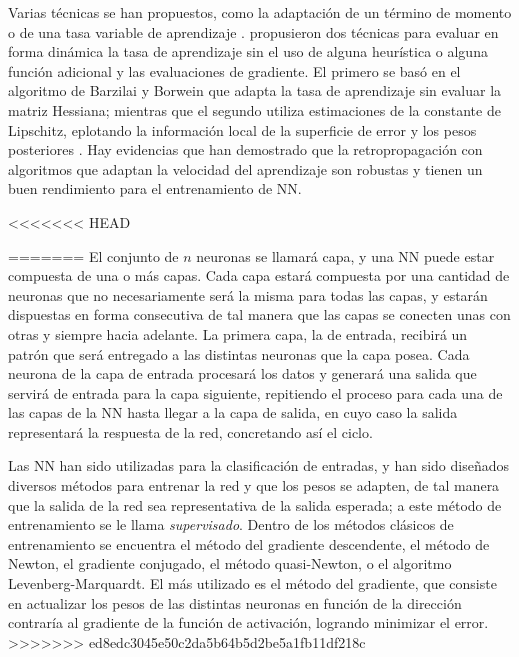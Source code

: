 Varias técnicas se han propuestos, como la adaptación de un término de momento \cite{Jacobs1988, Rumelhart1986b} o de una tasa variable de aprendizaje \cite{Jacobs1988,Vogl1988}.  propusieron dos técnicas para evaluar en forma dinámica la tasa de aprendizaje sin el uso de alguna heurística o alguna función adicional y las evaluaciones de gradiente. El primero se basó en el algoritmo de Barzilai y Borwein \cite{Barzilai1988} que adapta la tasa de aprendizaje sin evaluar la matriz Hessiana; mientras que el segundo utiliza estimaciones de la constante de Lipschitz, eplotando la información local de la superficie de error y los pesos posteriores \cite{Magoulas1997}. Hay evidencias \cite{Magoulas1997, Plagianakos2002, Plagianakos1998} que han demostrado que la retropropagación con algoritmos que adaptan la velocidad del aprendizaje son robustas y tienen un buen rendimiento para el entrenamiento de NN.

<<<<<<< HEAD

=======
El conjunto de $n$ neuronas se llamará capa, y una NN puede estar compuesta de una o más capas. Cada capa estará compuesta por una cantidad de neuronas que no necesariamente será la misma para todas las capas, y estarán dispuestas en forma consecutiva de tal manera que las capas se conecten unas con otras y siempre hacia adelante. La primera capa, la de entrada, recibirá un patrón que será entregado a las distintas neuronas que la capa posea. Cada neurona de la capa de entrada procesará los datos y generará una salida que servirá de entrada para la capa siguiente, repitiendo el proceso para cada una de las capas de la NN hasta llegar a la capa de salida, en cuyo caso la salida representará la respuesta de la red, concretando así el ciclo.

Las NN han sido utilizadas para la clasificación de entradas, y han sido diseñados diversos métodos para entrenar la red y que los pesos se adapten, de tal manera que la salida de la red sea representativa de la salida esperada; a este método de entrenamiento se le llama {\em supervisado}. Dentro de los métodos clásicos de entrenamiento se encuentra el método del gradiente descendente, el método de Newton, el gradiente conjugado, el método quasi-Newton, o el algoritmo Levenberg-Marquardt. El más utilizado es el método del gradiente, que consiste en actualizar los pesos de las distintas neuronas en función de la dirección contraría al gradiente de la función de activación, logrando minimizar el error.
>>>>>>> ed8edc3045e50c2da5b64b5d2be5a1fb11df218c



